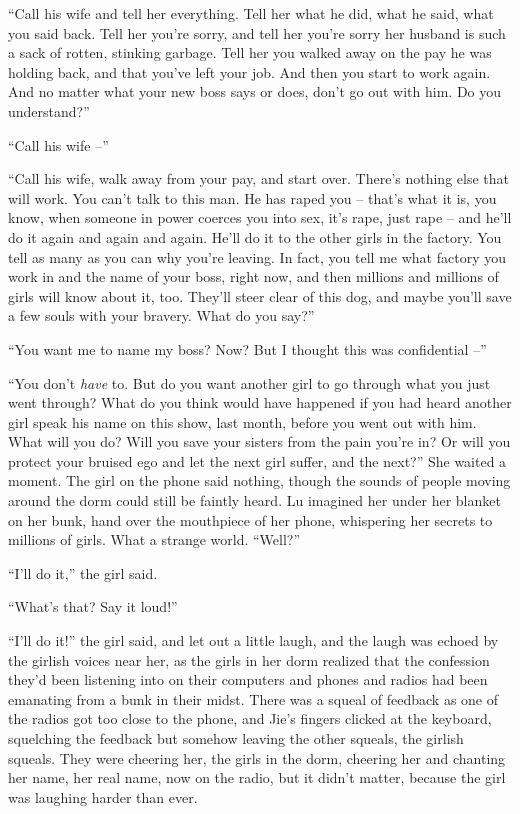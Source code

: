 ``Call his wife and tell her everything. Tell her what he did, what
he said, what you said back. Tell her you're sorry, and tell her
you're sorry her husband is such a sack of rotten, stinking
garbage. Tell her you walked away on the pay he was holding back,
and that you've left your job. And then you start to work again.
And no matter what your new boss says or does, don't go out with
him. Do you understand?''

``Call his wife --''

``Call his wife, walk away from your pay, and start over. There's
nothing else that will work. You can't talk to this man. He has
raped you -- that's what it is, you know, when someone in power
coerces you into sex, it's rape, just rape -- and he'll do it again
and again and again. He'll do it to the other girls in the factory.
You tell as many as you can why you're leaving. In fact, you tell
me what factory you work in and the name of your boss, right now,
and then millions and millions of girls will know about it, too.
They'll steer clear of this dog, and maybe you'll save a few souls
with your bravery. What do you say?''

``You want me to name my boss? Now? But I thought this was
confidential --''

``You don't \emph{have} to. But do you want another girl to go
through what you just went through? What do you think would have
happened if you had heard another girl speak his name on this show,
last month, before you went out with him. What will you do? Will
you save your sisters from the pain you're in? Or will you protect
your bruised ego and let the next girl suffer, and the next?'' She
waited a moment. The girl on the phone said nothing, though the
sounds of people moving around the dorm could still be faintly
heard. Lu imagined her under her blanket on her bunk, hand over the
mouthpiece of her phone, whispering her secrets to millions of
girls. What a strange world. ``Well?''

``I'll do it,'' the girl said.

``What's that? Say it loud!''

``I'll do it!'' the girl said, and let out a little laugh, and the
laugh was echoed by the girlish voices near her, as the girls in
her dorm realized that the confession they'd been listening into on
their computers and phones and radios had been emanating from a
bunk in their midst. There was a squeal of feedback as one of the
radios got too close to the phone, and Jie's fingers clicked at the
keyboard, squelching the feedback but somehow leaving the other
squeals, the girlish squeals. They were cheering her, the girls in
the dorm, cheering her and chanting her name, her real name, now on
the radio, but it didn't matter, because the girl was laughing
harder than ever.

